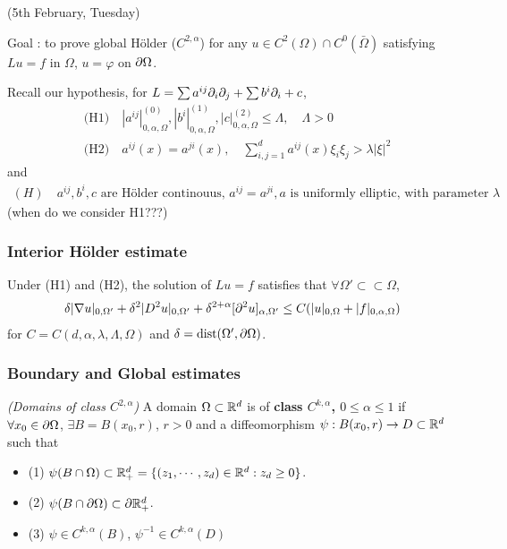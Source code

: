 \documentclass[12pt,a4paper]{article}
\renewenvironment{i}
{\begin{itemize} 
	}%
	{\end{itemize}
}
\begin{document}
\newday

(5th February, Tuesday)
\s

Goal : to prove global H\"older ($C^{2, \alpha}$) for any $u\in C^2(\Omega) \cap C^0(\bar{\Omega})$ satisfying $Lu =f$ in $\Omega$, $u =\varphi$ on $\partial \Omega$.

Recall our hypothesis, for $L = \sum a^{ij}\partial_i \partial_j + \sum b^i \partial_i +c$,
\begin{align*}
&\text{(H1)} \quad |a^{ij}|_{0, \alpha, \Omega}^{(0)}, |b^i|^{(1)}_{0, \alpha, \Omega}, |c|^{(2)}_{0, \alpha, \Omega}\leq \Lambda, \quad \Lambda>0 \\
&\text{(H2)} \quad a^{ij}(x) = a^{ji}(x), \quad \sum_{i,j=1}^d a^{ij}(x) \xi_i \xi_j > \lambda |\xi|^2
\end{align*}
and
\begin{align*}
(H) \quad a^{ij}, b^i, c \text{ are H\"older continouus, } a^{ij}=a^{ji}, a \text{ is uniformly elliptic, with parameter } \lambda
\end{align*}
(when do we consider H1???)
\s

\subsubsection*{Interior H\"older estimate}

\corr Under (H1) and (H2), the solution of $Lu =f$ satisfies that $\forall \Omega' \subset\subset \Omega$,
\begin{align*}
\delta |\nabla u |_{0, \Omega'} + \delta^2 |D^2 u|_{0, \Omega'} + \delta^{2+ \alpha}[\partial^2 u]_{\alpha, \Omega'}\leq C(|u|_{0, \Omega}+ |f|_{0, \alpha, \Omega})
\end{align*}
for $C = C(d, \alpha, \lambda, \Lambda, \Omega)$ and $\delta= \text{dist}(\Omega', \partial \Omega)$. 
\s

\subsubsection*{Boundary and Global estimates}

 \emph{(Domains of class $C^{2, \alpha}$)} A domain  $\Omega \subset \mathbb{R}^d$ is of \textbf{class $C^{k, \alpha}$, $0\leq \alpha \leq 1$} if $\forall x_0 \in \partial \Omega$, $\exists B = B(x_0, r)$, $r>0$ and a diffeomorphism $\psi : B(x_0, r) \rightarrow D\subset \mathbb{R}^d$ such that
\begin{i}
\item[(1)] $\psi(B\cap \Omega) \subset \mathbb{R}^d_+ = \{(z_1, \cdots, z_d) \in \mathbb{R}^d: z_d \geq 0 \}$.
\item[(2)] $\psi(B\cap \partial \Omega) \subset \partial \mathbb{R}_+^d$.
\item[(3)] $\psi \in C^{k, \alpha}(B)$, $\psi^{-1} \in C^{k, \alpha}(D)$ 
\end{i}
\s
\end{document}
